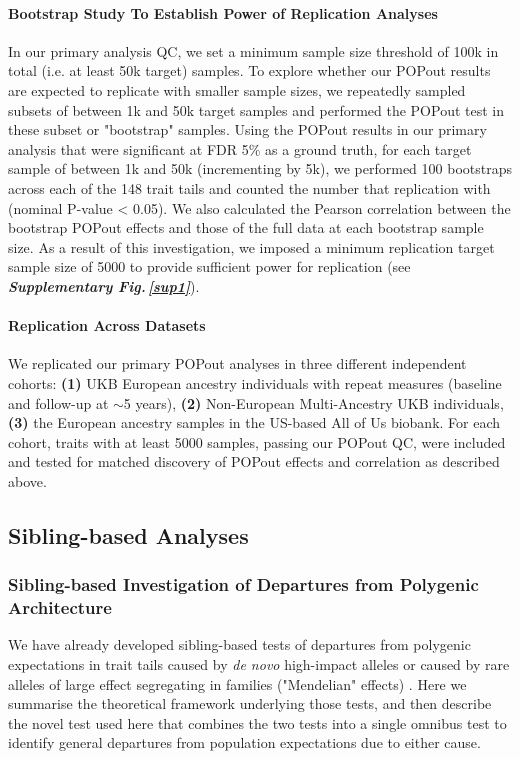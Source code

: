 \documentclass[12pt]{zHenriquesLab-StyleBioRxiv}
\newcommand\sref[1]{\normalsize{\textbf{\textit{Supplementary Fig.\,\ref{#1}}}}\normalsize{}}
\begin{document}
\paragraph{Bootstrap Study To Establish Power of Replication Analyses}
In our primary analysis QC, we set a minimum sample size threshold of 100k in total 
(i.e. at least 50k target) samples. To explore whether our POPout results are expected 
to replicate with smaller sample sizes, we repeatedly sampled subsets of between 1k and 50k 
target samples and performed the POPout test in these subset or "bootstrap" samples. 
Using the POPout results in our primary analysis that were significant at FDR 5\% as a ground 
truth, for each target sample of between 1k and 50k (incrementing by 5k), 
we performed 100 bootstraps across each of the 148 trait tails and counted 
the number that replication with (nominal P-value < 0.05). 
We also calculated the Pearson correlation between the bootstrap 
POPout effects and those of the full data at each bootstrap sample size. As a result of 
this investigation, we imposed a minimum replication target sample size of 5000 to 
provide sufficient power for replication (see \sref{sup1}). 


\paragraph{Replication Across Datasets} 
We replicated our primary POPout analyses in three different independent cohorts:  
\textbf{(1)} UKB European ancestry individuals with repeat measures (baseline and follow-up at $\sim$5 years), 
\textbf{(2)} Non-European Multi-Ancestry UKB individuals, \textbf{(3)} the European ancestry samples in the 
US-based All of Us biobank. For each cohort, traits with at least 5000 samples, passing our POPout QC, 
were included and tested for matched discovery of POPout effects and correlation as described above. 
%
\subsection*{Sibling-based Analyses} \label{sec:methods:sibs}  
%
\subsubsection*{Sibling-based Investigation of Departures from Polygenic Architecture}
We have already developed sibling-based tests of departures from polygenic expectations in trait tails caused by \emph{de novo} high-impact alleles or caused by rare alleles of large effect segregating in families ("Mendelian" effects) \cite{Souaiaia2024}. Here we summarise the theoretical framework underlying those tests, and then describe the novel test used here that combines the two tests into a single omnibus test to identify general departures from population expectations due to either cause.
\end{document}
